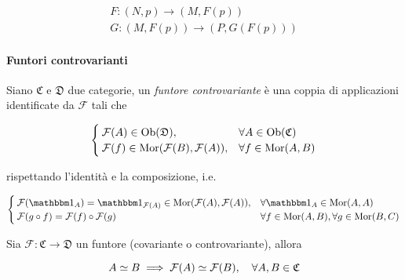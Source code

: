 \begin{gather}
	F : (N,p) \to (M,F(p)) \\
	G : (M,F(p)) \to (P,G(F(p)))
\end{gather}

\paragraph{Funtori controvarianti}

Siano $ \mathfrak{C} $ e $ \mathfrak{D} $ due categorie, un \textit{funtore controvariante} è una coppia di applicazioni identificate da $ \mathcal{F} $ tali che

\begin{equation}
	\begin{cases}
		\mathcal{F}(A) \in \operatorname{Ob}(\mathfrak{D}), & \forall A \in \operatorname{Ob}(\mathfrak{C}) \\
		\mathcal{F}(f) \in \operatorname{Mor}(\mathcal{F}(B),\mathcal{F}(A)), & \forall f \in \operatorname{Mor}(A,B)
	\end{cases}
\end{equation}

rispettando l'identità e la composizione, i.e.

\begin{equation}
	\begin{cases}
		\mathcal{F}(\bigone_{A}) = \bigone_{\mathcal{F}(A)} \in \mor(\mathcal{F}(A),\mathcal{F}(A)), & \forall \bigone_{A} \in \mor(A,A) \\
		\mathcal{F}(g \circ f) = \mathcal{F}(f) \circ \mathcal{F}(g) & \forall f \in \mor(A,B), \forall g \in \mor(B,C)
	\end{cases}
\end{equation}

\begin{remark}
	Sia $ \mathcal{F} : \mathfrak{C} \to \mathfrak{D} $ un funtore (covariante o controvariante), allora
	
	\begin{equation}
		A \simeq B \implies \mathcal{F}(A) \simeq \mathcal{F}(B) \qcomma \forall A,B \in \mathfrak{C}
	\end{equation}
\end{remark}

